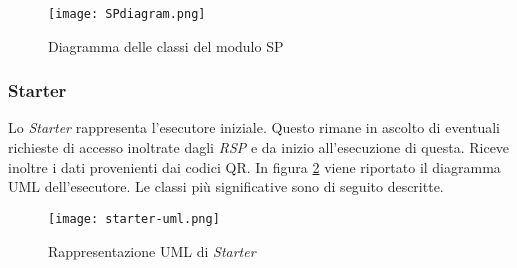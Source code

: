 \begin{figure}[!htbp]
    \centering
    \texttt{[image: SPdiagram.png]} 
    \caption{Diagramma delle classi del modulo SP}
    \label{fig:sp-uml-diag} 
\end{figure}

\subsubsection{Starter}
Lo \emph{Starter} rappresenta l’esecutore iniziale. Questo rimane in ascolto di eventuali richieste di accesso inoltrate dagli \emph{RSP} e da inizio all’esecuzione di questa. Riceve inoltre i dati provenienti dai codici QR. In figura \ref{fig:starter-uml-diag} viene riportato il diagramma UML dell'esecutore. Le classi più significative sono di seguito descritte.
\begin{figure}[htbp]
    \centering
    \texttt{[image: starter-uml.png]} 
    \caption{Rappresentazione UML di \emph{Starter}}
    \label{fig:starter-uml-diag} 
\end{figure}
\begin{namespacedesc}
\end{namespacedesc}

